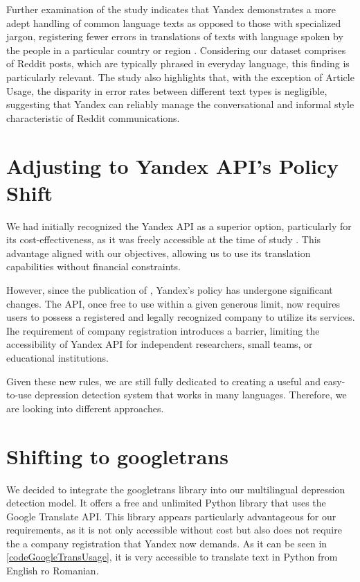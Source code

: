 Further examination of the study indicates that Yandex demonstrates a more adept handling of common language texts as opposed to those with specialized jargon, registering fewer errors in translations of texts with language spoken by the people in a particular country or region \cite{cambedda2021study}. Considering our dataset comprises of Reddit posts, which are typically phrased in everyday language, this finding is particularly relevant. The study also highlights that, with the exception of Article Usage, the disparity in error rates between different text types is negligible, suggesting that Yandex can reliably manage the conversational and informal style characteristic of Reddit communications.

\section{Adjusting to Yandex API's Policy Shift}

\quad We had initially recognized the Yandex API as a superior option, particularly for its cost-effectiveness, as it was freely accessible at the time of study \cite{rashmi2020comparison}. This advantage aligned with our objectives, allowing us to use its translation capabilities without financial constraints.

However, since the publication of \cite{rashmi2020comparison}, Yandex's policy has undergone significant changes. The API, once free to use within a given generous limit, now requires users to possess a registered and legally recognized company to utilize its services. Ihe requirement of company registration introduces a barrier, limiting the accessibility of Yandex API for independent researchers, small teams, or educational institutions.

Given these new rules, we are still fully dedicated to creating a useful and easy-to-use depression detection system that works in many languages. Therefore, we are looking into different approaches.

\section{Shifting to googletrans}

\quad We decided to integrate the googletrans library \cite{googletranslib} into our multilingual depression detection model. It offers a free and unlimited Python library that uses the Google Translate API. This library appears particularly advantageous for our requirements, as it is not only accessible without cost but also does not require the a company registration that Yandex now demands. As it can be seen in \ref{codeGoogleTransUsage}, it is very accessible to translate text in Python from English ro Romanian.

